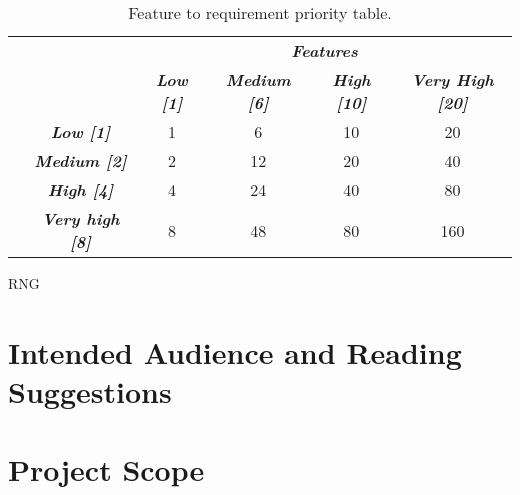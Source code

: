 	\begin{table}[!htbp]
		\centering
		\caption{Feature to requirement priority table.}
		\label{tab:feature-to-requirement-priority-table}
		\begin{tabular}{cc|c|c|c|c|}
			\cline{3-6}
			&  & \multicolumn{4}{c|}{\textit{\textbf{Features}}} \\ \cline{3-6} 
			&  & \textit{\textbf{Low {[}1{]}}} & \textit{\textbf{Medium {[}6{]}}} & \textit{\textbf{High {[}10{]}}} & \textit{\textbf{Very High {[}20{]}}} \\ \hline
			\multicolumn{1}{|c|}{\multirow{4}{*}{\rotatebox[origin=c]{90}{\textit{\textbf{Functions}}}}} & \textit{\textbf{Low {[}1{]}}} & 1 & 6 & 10 & 20 \\ \cline{2-6} 
			\multicolumn{1}{|c|}{} & \textit{\textbf{Medium {[}2{]}}} & 2 & 12 & 20 & 40 \\ \cline{2-6} 
			\multicolumn{1}{|c|}{} & \textit{\textbf{High {[}4{]}}} & 4 & 24 & 40 & 80 \\ \cline{2-6} 
			\multicolumn{1}{|c|}{} & \textit{\textbf{Very high {[}8{]}}} & 8 & 48 & 80 & 160 \\ \hline
		\end{tabular}
	\end{table}
	\gls{RNG}
\section{Intended Audience and Reading Suggestions}
	\begin{comment}
		$<$Describe the different types of reader that the document is intended for, 
		such as developers, project managers, marketing staff, users, testers, and 
		documentation writers. Describe what the rest of this SRS contains and how it is 
		organized. Suggest a sequence for reading the document, beginning with the 
		overview sections and proceeding through the sections that are most pertinent to 
		each reader type.$>$
	\end{comment}
	
\section{Project Scope}
	\begin{comment}
		$<$Provide a short description of the software being specified and its purpose, 
		including relevant benefits, objectives, and goals. Relate the software to 
		corporate goals or business strategies. If a separate vision and scope document 
		is available, refer to it rather than duplicating its contents here.$>$
	\end{comment}

